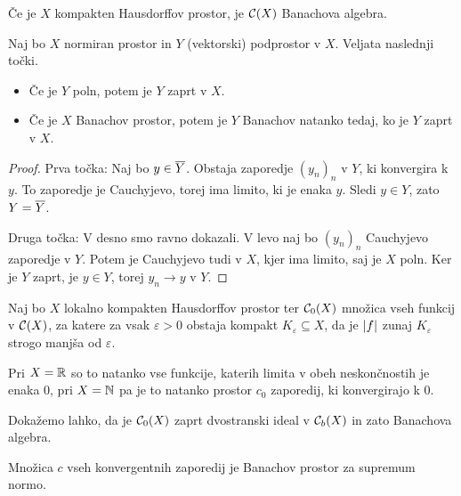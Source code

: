 \begin{posledica}
  Če je $X$ kompakten Hausdorffov prostor, je $\mathcal{C}(X)$ Banachova algebra.
\end{posledica}

\begin{trditev}
  Naj bo $X$ normiran prostor in $Y$ (vektorski) podprostor v $X$.
  Veljata naslednji točki.
  \begin{itemize}
  \item Če je $Y$ poln, potem je $Y$ zaprt v $X$.
  \item Če je $X$ Banachov prostor, potem je $Y$ Banachov natanko tedaj, ko je
	$Y$ zaprt v $X$.
  \end{itemize}
\end{trditev}

\begin{proof}
  Prva točka:
  Naj bo $y \in \overline{Y}$.
  Obstaja zaporedje $(y_n)_n$ v $Y$, ki konvergira k $y$.
  To zaporedje je Cauchyjevo, torej ima limito, ki je enaka $y$.
  Sledi $y \in Y$, zato $Y = \overline{Y}$.

  Druga točka:
  V desno smo ravno dokazali.
  V levo naj bo $(y_n)_n$ Cauchyjevo zaporedje v $Y$.
  Potem je Cauchyjevo tudi v $X$, kjer ima limito, saj je $X$ poln.
  Ker je $Y$ zaprt, je $y \in Y$, torej $y_n \to y$ v $Y$.
\end{proof}


\begin{primer}
  Naj bo $X$ lokalno kompakten Hausdorffov prostor ter $\mathcal{C}_0(X)$ množica
  vseh funkcij v $\mathcal{C}(X)$, za katere za vsak $\varepsilon > 0$ obstaja
  kompakt $K_\varepsilon \subseteq X$, da je $\left| f \right|$ zunaj $K_\varepsilon$
  strogo manjša od $\varepsilon$.

  Pri $X = \mathbb{R}$ so to natanko vse funkcije, katerih limita v obeh neskončnostih
  je enaka $0$, pri $X = \mathbb{N}$ pa je to natanko prostor $c_0$ zaporedij, ki
  konvergirajo k $0$.

  Dokažemo lahko, da je $\mathcal{C}_0(X)$ zaprt dvostranski ideal v
  $\mathcal{C}_b(X)$ in zato Banachova algebra.
\end{primer}

\begin{primer}
  Množica $c$ vseh konvergentnih zaporedij je Banachov prostor za supremum
  normo.
\end{primer}

